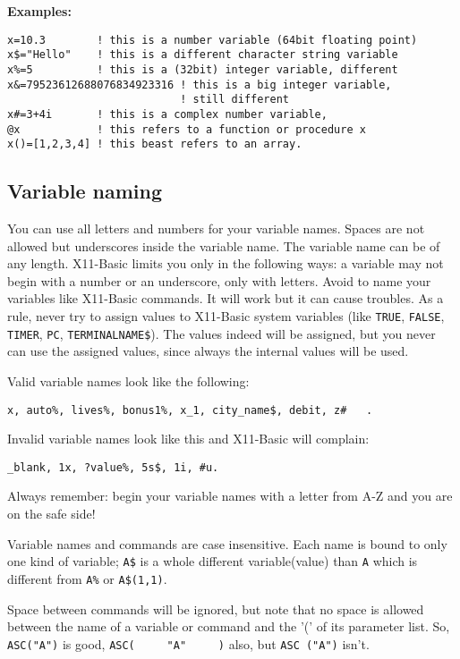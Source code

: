 \begin{mdframed}[hidealllines=true,backgroundcolor=blue!20]
{\bf Examples:}
\begin{verbatim}
x=10.3        ! this is a number variable (64bit floating point)
x$="Hello"    ! this is a different character string variable
x%=5          ! this is a (32bit) integer variable, different
x&=79523612688076834923316 ! this is a big integer variable, 
                           ! still different
x#=3+4i       ! this is a complex number variable, 
@x            ! this refers to a function or procedure x
x()=[1,2,3,4] ! this beast refers to an array.
\end{verbatim}
\end{mdframed}

\subsection{Variable naming}

You can use all letters and numbers for your variable names. Spaces are not
allowed but underscores inside the variable name. The variable name can be of
any length. X11-Basic limits you only in the following ways: a variable may not
begin with a number or an underscore, only with letters. Avoid to name your
variables like X11-Basic commands. It will work but it can cause troubles. As a
rule, never try to assign values to X11-Basic system variables (like 
\verb|TRUE|, \verb|FALSE|, \verb|TIMER|, \verb|PC|, \verb|TERMINALNAME$|). The
values indeed will be assigned, but you never can use the assigned values, since
always the internal values will be used.

Valid variable names look like the following: 
\begin{verbatim}
x, auto%, lives%, bonus1%, x_1, city_name$, debit, z#   . 
\end{verbatim}

Invalid variable names look like this and X11-Basic
will complain: 
\begin{verbatim}
_blank, 1x, ?value%, 5s$, 1i, #u. 
\end{verbatim}
Always remember: begin your variable names with a letter from A-Z and you are on
the safe side!

Variable names and commands are case insensitive. Each name is bound to only
one kind of variable; \verb|A$| is a whole different variable(value) than
\verb|A| which is different from \verb|A%| or \verb|A$(1,1)|.

Space between commands will be ignored, but note that no space is allowed 
between the name of a variable or command and the '(' of its parameter list. 
So, \verb|ASC("A")| is good, \verb|ASC(     "A"     )| also,
but \verb|ASC ("A")| isn't.


